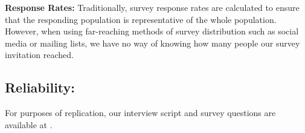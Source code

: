 \textbf{Response Rates:}
Traditionally, survey response rates are calculated to ensure that the responding population is representative of the whole population. However, when using far-reaching methods of survey distribution such as social media or mailing lists, we have no way of knowing how many people our survey invitation reached.

\subsection{Reliability:}
For purposes of replication, our interview script and survey questions are available at \cite{companion_site}. 
